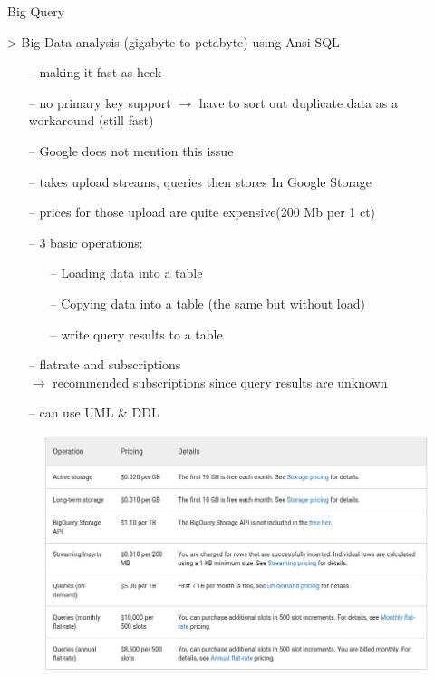 \documentclass{beamer}
\begin{document}
\begin{frame}{Big Query}
	\begin{definition} > Big Data analysis (gigabyte to petabyte) using Ansi SQL \end{definition}
	\begin{itemize}
	\item[--] making it fast as heck 
	\item[--] no primary key support $\rightarrow$ have to sort out duplicate data as a workaround (still fast)
	\item[--] Google does not mention this issue

	\item[--] takes upload streams, queries then stores In Google Storage
	\item[--] prices for those upload are quite expensive(200 Mb per 1 ct)
	\item[--] 3 basic operations: 
	\begin{itemize}
	  \item[--] Loading data into a table
	  \item[--] Copying data into a table (the same but without load)
	  \item[--] write query results to a table 
	\end{itemize}
\item[--] flatrate and subscriptions \\ $\rightarrow$ recommended subscriptions since query results are unknown
\item[--] can use UML \& DDL
	\end{itemize}

\end{frame}
\begin{frame}
	\begin{figure}
		\centering
		\includegraphics[width=0.7\linewidth]{BigQuerycosts}
	\end{figure}
	
\end{frame}
\end{document}
